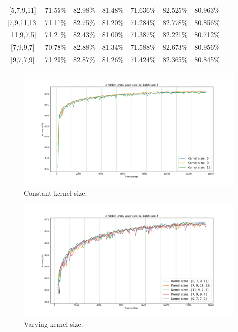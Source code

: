 \begin{table}[H]
\begin{tabular}{ccccccc}
\multicolumn{1}{c|}{{[}5,7,9,11{]}} & 71.55\% & 82.98\% & \multicolumn{1}{c|}{81.48\%} & 71.636\% & 82.525\% & 80.963\% \\
\multicolumn{1}{c|}{{[}7,9,11,13{]}} & 71.17\% & 82.75\% & \multicolumn{1}{c|}{81.20\%} & 71.284\% & 82.778\% & 80.856\% \\
\multicolumn{1}{c|}{{[}11,9,7,5{]}} & 71.21\% & 82.43\% & \multicolumn{1}{c|}{81.00\%} & 71.387\% & 82.221\% & 80.712\% \\
\multicolumn{1}{c|}{{[}7,9,9,7{]}} & 70.78\% & 82.88\% & \multicolumn{1}{c|}{81.34\%} & 71.588\% & 82.673\% & 80.956\% \\
\multicolumn{1}{c|}{{[}9,7,7,9{]}} & 71.20\% & 82.87\% & \multicolumn{1}{c|}{81.26\%} & 71.424\% & 82.365\% & 80.845\%
\end{tabular}
\end{table}
\begin{figure}[H]
  \centering
  \includegraphics[width=\linewidth]{../graphs/new/kernel_sizes_2}
  \caption{Constant kernel size.}
\end{figure}

\begin{figure}[H]
  \centering
  \includegraphics[width=\linewidth]{../graphs/new/kernel_sizes_1}
  \caption{Varying kernel size.}
\end{figure}

